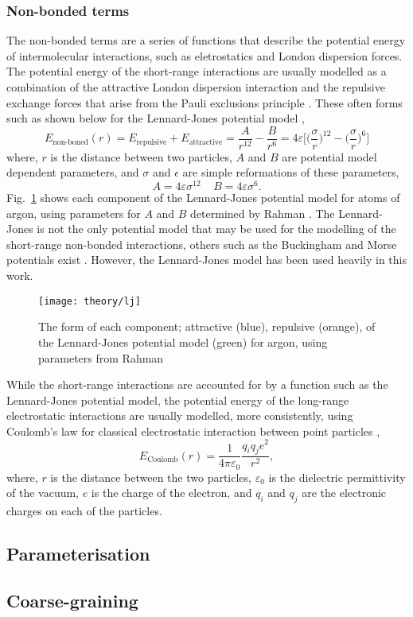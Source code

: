 \subsubsection{Non-bonded terms}
The non-bonded terms are a series of functions that describe the potential energy of intermolecular interactions, such as eletrostatics and London dispersion forces.
The potential energy of the short-range interactions are usually modelled as a combination of the attractive London dispersion interaction and the repulsive exchange forces that arise from the Pauli exclusions principle \cite{Leach1996}.
These often forms such as shown below for the Lennard-Jones potential model \cite{LennardJones1924},
%
\begin{equation}
  E_{\text{non-boned}}(r) = E_{\text{repulsive}} + E_{\text{attractive}} = \frac{A}{r^{12}} - \frac{B}{r^6} = 4\varepsilon\Bigg[\bigg(\frac{\sigma}{r}\bigg)^{12} - \bigg(\frac{\sigma}{r}\bigg)^6\Bigg]
\end{equation}
%
where, $r$ is the distance between two particles, $A$ and $B$ are potential model dependent parameters, and $\sigma$ and $\epsilon$ are simple reformations of these parameters,
%
\begin{equation}
  A = 4\varepsilon\sigma^{12} \;\;\;\; B = 4\varepsilon\sigma^6.
\end{equation}
%
Fig.~\ref{fig:lj} shows each component of the Lennard-Jones potential model for atoms of argon, using parameters for $A$ and $B$ determined by Rahman \cite{Rahman1964}.
The Lennard-Jones is not the only potential model that may be used for the modelling of the short-range non-bonded interactions, others such as the Buckingham and Morse potentials exist \cite{Buckingham1938, Morse1929}.
However, the Lennard-Jones model has been used heavily in this work.
%
\begin{figure}
	\centering
	\texttt{[image: theory/lj]}
	\caption{The form of each component; attractive (blue), repulsive (orange), of the Lennard-Jones potential model (green) for argon, using parameters from Rahman \cite{Rahman1964}}
	\label{fig:lj}
\end{figure}
%

While the short-range interactions are accounted for by a function such as the Lennard-Jones potential model, the potential energy of the long-range electrostatic interactions are usually modelled, more consistently, using Coulomb's law for classical electrostatic interaction between point particles \cite{Coulomb1788, Coulomb1788a},
%
\begin{equation}
  E_{\text{Coulomb}}(r) = \frac{1}{4\pi\varepsilon_0}{\frac{q_iq_je^2}{r^2}},
\end{equation}
%
where, $r$ is the distance between the two particles, $\varepsilon_0$ is the dielectric permittivity of the vacuum, $e$ is the charge of the electron, and $q_i$ and $q_j$ are the electronic charges on each of the particles.





\subsection{Parameterisation}
\label{sec:parameterisation}
\subsection{Coarse-graining}
